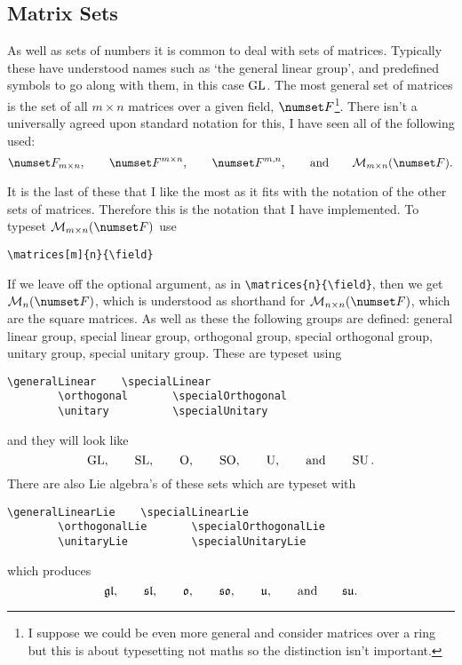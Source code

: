 \documentclass[fleqn, a4paper, openany]{memoir}
\begin{document}
    \subsection{Matrix Sets}
    As well as sets of numbers it is common to deal with sets of matrices.
    Typically these have understood names such as `the general linear group', and predefined symbols to go along with them, in this case \(\operatorname{GL}\).
    The most general set of matrices is the set of all \(m\times n\) matrices over a given field, \(\field\)\footnote{I suppose we could be even more general and consider matrices over a ring but this is about typesetting not maths so the distinction isn't important.}.
    There isn't a universally agreed upon standard notation for this, I have seen all of the following used:
    \begin{equation}
        \field_{m\times n}, \qquad \field^{m\times n}, \qquad \field^{m, n}, \qquad\text{and}\qquad \matrices[m]{n}{\field}.
    \end{equation}
    
    It is the last of these that I like the most as it fits with the notation of the other sets of matrices.
    Therefore this is the notation that I have implemented.
    To typeset \(\matrices[m]{n}{\field}\) use
    \begin{Verbatim}[gobble=2]
        \matrices[m]{n}{\field}
    \end{Verbatim}
    If we leave off the optional argument, as in \verb|\matrices{n}{\field}|, then we get \(\matrices{n}{\field}\), which is understood as shorthand for \(\matrices[n]{n}{\field}\), which are the square matrices.
    As well as these the following groups are defined: general linear group, special linear group, orthogonal group, special orthogonal group, unitary group, special unitary group.
    These are typeset using
    \begin{Verbatim}[gobble=2]
        \generalLinear    \specialLinear
        \orthogonal       \specialOrthogonal
        \unitary          \specialUnitary
    \end{Verbatim}
    and they will look like
    \begin{equation}
        \operatorname{GL}, \qquad \operatorname{SL}, \qquad \operatorname{O}, \qquad \operatorname{SO}, \qquad \operatorname{U}, \qquad\text{and}\qquad \operatorname{SU}.
    \end{equation}
    There are also Lie algebra's of these sets which are typeset with
    \begin{Verbatim}[gobble=2]
        \generalLinearLie    \specialLinearLie
        \orthogonalLie       \specialOrthogonalLie
        \unitaryLie          \specialUnitaryLie
    \end{Verbatim}
    which produces
    \begin{equation}
        \mathfrak{gl}, \qquad \mathfrak{sl}, \qquad \mathfrak{o}, \qquad \mathfrak{so}, \qquad \mathfrak{u}, \qquad\text{and}\qquad \mathfrak{su}.
    \end{equation}
    
\end{document}
